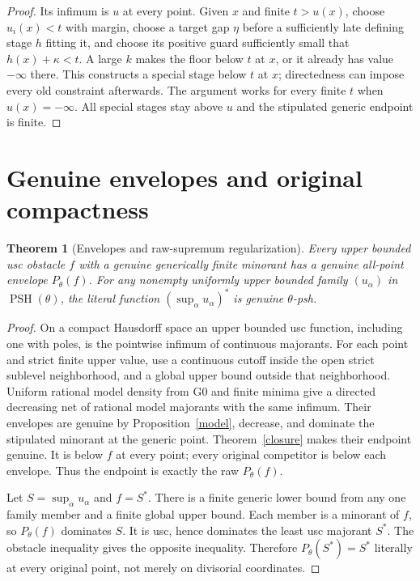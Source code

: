 \documentclass[10pt]{article}
\newtheorem{theorem}{Theorem}[section]
\newcommand{\PSH}{\operatorname{PSH}}
\begin{document}
\begin{proof}
Its infimum is $u$ at every point. Given $x$ and finite $t>u(x)$,
choose $u_i(x)<t$ with margin, choose a target gap $\eta$ before
a sufficiently late defining stage $h$ fitting it, and choose its
positive guard sufficiently small that $h(x)+\kappa<t$. A large
$k$ makes the floor below $t$ at $x$, or it already has value
$-\infty$ there. This constructs a special stage below $t$ at $x$;
directedness can impose every old constraint afterwards. The argument
works for every finite $t$ when $u(x)=-\infty$. All special stages
stay above $u$ and the stipulated generic endpoint is finite.
\end{proof}

\section{Genuine envelopes and original compactness}
\begin{theorem}[Envelopes and raw-supremum regularization]\label{envelopes}
Every upper bounded usc obstacle $f$ with a genuine generically finite
minorant has a genuine all-point envelope $P_\theta(f)$.
For any nonempty uniformly upper bounded family $(u_\alpha)$ in
$\PSH(\theta)$, the literal function
$(\sup_\alpha u_\alpha)^*$ is genuine $\theta$-psh.
\end{theorem}
\begin{proof}
On a compact Hausdorff space an upper bounded usc function, including
one with poles, is the pointwise infimum of continuous majorants.
For each point and strict finite upper value, use a continuous cutoff
inside the open strict sublevel neighborhood, and a global upper
bound outside that neighborhood. Uniform rational model density from
G0 and finite minima give a directed decreasing net of rational
model majorants with the same infimum. Their envelopes are genuine
by Proposition~\ref{model}, decrease, and dominate the stipulated
minorant at the generic point. Theorem~\ref{closure} makes their
endpoint genuine. It is below $f$ at every point; every original
competitor is below each envelope. Thus the endpoint is exactly
the raw $P_\theta(f)$.

Let $S=\sup_\alpha u_\alpha$ and $f=S^*$. There is a finite generic
lower bound from any one family member and a finite global upper bound.
Each member is a minorant of $f$, so $P_\theta(f)$ dominates $S$.
It is usc, hence dominates the least usc majorant $S^*$. The obstacle
inequality gives the opposite inequality. Therefore
$P_\theta(S^*)=S^*$ literally at every original point, not merely
on divisorial coordinates.
\end{proof}
\end{document}
